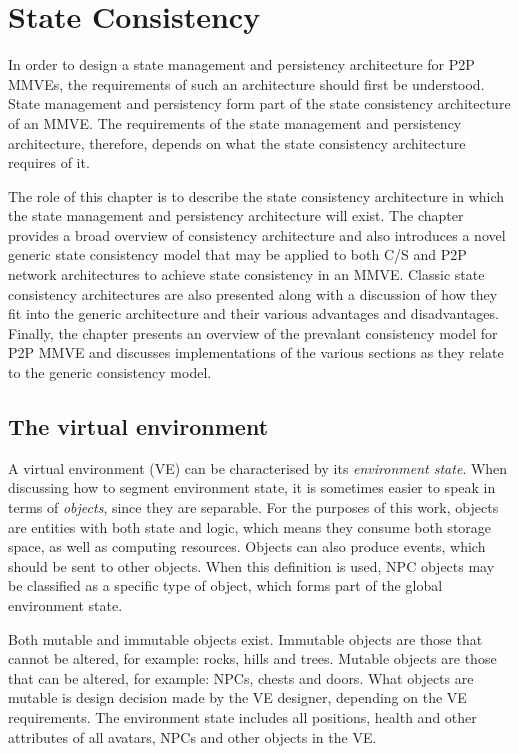 \chapter{State Consistency}
\label{chp:CONSISTENCY}

In order to design a state management and persistency architecture for P2P MMVEs, the requirements of such an architecture should first be understood. State management and persistency form part of the state consistency architecture of an MMVE. The requirements of the state management and persistency architecture, therefore, depends on what the state consistency architecture requires of it.

The role of this chapter is to describe the state consistency architecture in which the state management and persistency architecture will exist. The chapter provides a broad overview of consistency architecture and also introduces a novel generic state consistency model that may be applied to both C/S and P2P network architectures to achieve state consistency in an MMVE. Classic state consistency architectures are also presented along with a discussion of how they fit into the generic architecture and their various advantages and disadvantages. Finally, the chapter presents an overview of the prevalant consistency model for P2P MMVE and discusses implementations of the various sections as they relate to the generic consistency model.

\section{The virtual environment}

A virtual environment (VE) can be characterised by its \emph{environment state}. When discussing how to segment environment state, it is sometimes easier to speak in terms of \emph{objects}, since they are separable. For the purposes of this work, objects are entities with both state and logic, which means they consume both storage space, as well as computing resources. Objects can also produce events, which should be sent to other objects. When this definition is used, NPC objects may be classified as a specific type of object, which forms part of the global environment state.

Both mutable and immutable objects exist. Immutable objects are those that cannot be altered, for example: rocks, hills and trees. Mutable objects are those that can be altered, for example: NPCs, chests and doors. What objects are mutable is design decision made by the VE designer, depending on the VE requirements. The environment state includes all positions, health and other attributes of all avatars, NPCs and other objects in the VE.

